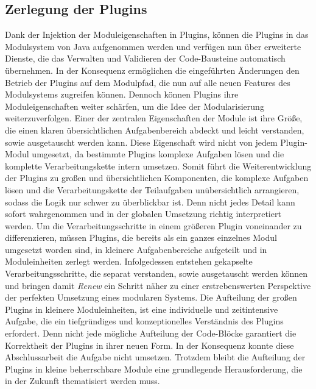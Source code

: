  \subsection*{Zerlegung der Plugins}
	Dank der Injektion der Moduleigenschaften in Plugins, können die Plugins in das Modulsystem von Java aufgenommen werden und verfügen nun über erweiterte Dienste, die das Verwalten und Validieren der Code-Bausteine automatisch übernehmen. In der Konsequenz ermöglichen die eingeführten Änderungen den Betrieb der Plugins auf dem Modulpfad, die nun auf alle neuen Features des Modulsystems zugreifen können. Dennoch können Plugins ihre Moduleigenschaften weiter schärfen, um die Idee der Modularisierung weiterzuverfolgen. \newline
	Einer der zentralen Eigenschaften der Module ist ihre Größe, die einen klaren übersichtlichen Aufgabenbereich abdeckt und leicht verstanden, sowie ausgetauscht werden kann. Diese Eigenschaft wird nicht von jedem Plugin-Modul umgesetzt, da bestimmte Plugins komplexe Aufgaben lösen und die komplette Verarbeitungskette intern umsetzen. Somit führt die Weiterentwicklung der Plugins zu großen und übersichtlichen Komponenten, die komplexe Aufgaben lösen und die Verarbeitungskette der Teilaufgaben unübersichtlich arrangieren, sodass die Logik nur schwer zu überblickbar ist. Denn nicht jedes Detail kann sofort wahrgenommen und in der globalen Umsetzung richtig interpretiert werden.\newline
	Um die Verarbeitungsschritte in einem größeren Plugin voneinander zu differenzieren, müssen Plugins, die bereits als ein ganzes einzelnes Modul umgesetzt worden sind, in kleinere Aufgabenbereiche aufgeteilt und in Moduleinheiten zerlegt werden. Infolgedessen entstehen gekapselte Verarbeitungsschritte, die separat verstanden, sowie ausgetauscht werden können und bringen damit  \textit{Renew} ein Schritt näher zu einer erstrebenswerten Perspektive der perfekten Umsetzung eines modularen Systems. \newline
	Die Aufteilung der großen Plugins in kleinere Moduleinheiten, ist eine individuelle und zeitintensive Aufgabe, die ein tiefgründiges und konzeptionelles Verständnis des Plugins erfordert. Denn nicht jede mögliche Aufteilung der Code-Blöcke garantiert die Korrektheit der Plugins in ihrer neuen Form. \newline
	In der Konsequenz konnte diese Abschlussarbeit die Aufgabe nicht umsetzen. Trotzdem bleibt die Aufteilung der Plugins in kleine beherrschbare Module eine grundlegende Herausforderung, die in der Zukunft thematisiert werden muss. 

